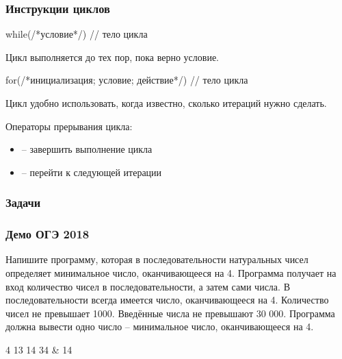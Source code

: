 \begin{frame}[fragile]
	\frametitle{Инструкции циклов}
	\begin{code}
while(/*условие*/)
{
	// тело цикла			
}
	\end{code}
	Цикл  выполняется до тех пор, пока верно условие.
	\begin{code}
for(/*инициализация; условие; действие*/)
{
	// тело цикла 		
}
	\end{code}
	Цикл  удобно использовать, когда известно, сколько итераций нужно
	сделать. \newline

	{\large Операторы прерывания цикла:}
	\begin{itemize}
		\item {} -- завершить выполнение цикла
		\item {} -- перейти к следующей итерации
	\end{itemize}
\end{frame}

\begin{frame}
	\frametitle{Задачи}
\end{frame}

\begin{frame}
	\frametitle{Демо ОГЭ 2018}
	Напишите программу, которая в последовательности натуральных чисел определяет
	минимальное число, оканчивающееся на 4. Программа получает на вход количество
	чисел в последовательности, а затем сами числа. В последовательности всегда
	имеется число, оканчивающееся на 4. Количество чисел не превышает 1000.
	Введённые числа не превышают 30 000. Программа должна вывести одно число --
	минимальное число, оканчивающееся на 4.
	\begin{ex}
	4  13 14 34 & 14 \tb
	\end{ex}
\end{frame}


